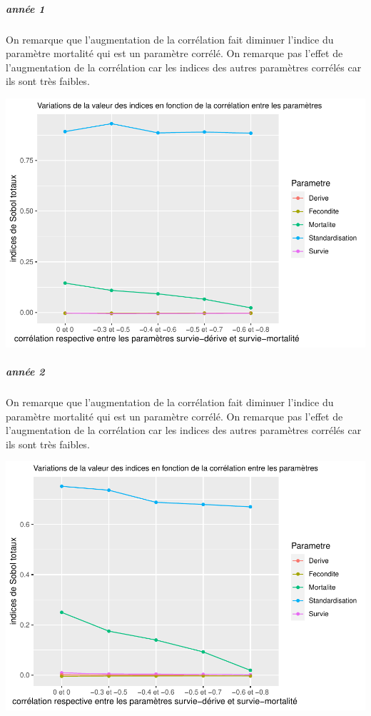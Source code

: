 \documentclass[
]{article}
\begin{document}
\hypertarget{annuxe9e-1-1}{%
\subparagraph{année 1}\label{annuxe9e-1-1}}

On remarque que l'augmentation de la corrélation fait diminuer l'indice
du paramètre mortalité qui est un paramètre corrélé. On remarque pas
l'effet de l'augmentation de la corrélation car les indices des autres
paramètres corrélés car ils sont très faibles.

\includegraphics{rapport_files/figure-latex/prtygsbtae-1.pdf}

\hypertarget{annuxe9e-2}{%
\subparagraph{année 2}\label{annuxe9e-2}}

On remarque que l'augmentation de la corrélation fait diminuer l'indice
du paramètre mortalité qui est un paramètre corrélé. On remarque pas
l'effet de l'augmentation de la corrélation car les indices des autres
paramètres corrélés car ils sont très faibles.

\includegraphics{rapport_files/figure-latex/prtygsbate-1.pdf}
\end{document}
